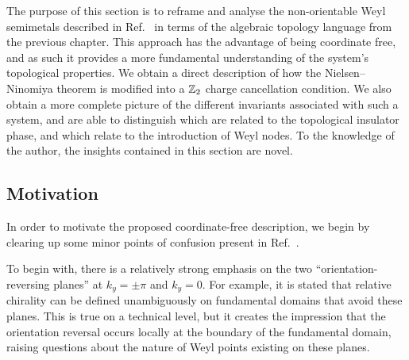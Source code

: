 

The purpose of this section is to reframe and analyse the non-orientable Weyl semimetals described in Ref.\ \cite{Fonseca-Vaidya_nonorientable} in terms of the algebraic topology language from the previous chapter. This approach has the advantage of being coordinate free, and as such it provides a more fundamental understanding of the system's topological properties. We obtain a direct description of how the Nielsen--Ninomiya theorem is modified into a $\mathbb{Z}_2$ charge cancellation condition. We also obtain a more complete picture of the different invariants associated with such a system, and are able to distinguish which are related to the topological insulator phase, and which relate to the introduction of Weyl nodes. To the knowledge of the author, the insights contained in this section are novel.

\subsection{Motivation}

In order to motivate the proposed coordinate-free description, we begin by clearing up some minor points of confusion present in Ref.\ \cite{Fonseca-Vaidya_nonorientable}.

To begin with, there is a relatively strong emphasis on the two ``orientation-reversing planes'' at $k_y=\pm\pi$ and $k_y=0$. For example, it is stated that relative chirality can be defined unambiguously on fundamental domains that avoid these planes. This is true on a technical level, but it creates the impression that the orientation reversal occurs locally at the boundary of the fundamental domain, raising questions about the nature of Weyl points existing on these planes.

